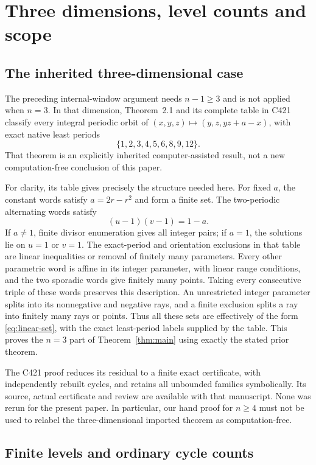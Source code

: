 \section{Three dimensions, level counts and scope}
\label{sec:completion}

\subsection{The inherited three-dimensional case}

The preceding internal-window argument needs $n-1\ge3$ and is not
applied when $n=3$. In that dimension, Theorem~2.1 and its complete
table in C421~\cite{c421} classify every integral periodic orbit of
$(x,y,z)\mapsto(y,z,yz+a-x)$, with exact native least periods
\[
 \{1,2,3,4,5,6,8,9,12\}.
\]
That theorem is an explicitly inherited computer-assisted result,
not a new computation-free conclusion of this paper.

For clarity, its table gives precisely the structure needed here.
For fixed $a$, the constant words satisfy $a=2r-r^2$ and form a
finite set. The two-periodic alternating words satisfy
\[
 (u-1)(v-1)=1-a.
\]
If $a\ne1$, finite divisor enumeration gives all integer pairs;
if $a=1$, the solutions lie on $u=1$ or $v=1$. The exact-period
and orientation exclusions in that table are linear inequalities
or removal of finitely many parameters. Every other parametric
word is affine in its integer parameter, with linear range
conditions, and the two sporadic words give finitely many points.
Taking every consecutive triple of these words preserves this
description. An unrestricted integer parameter splits into its
nonnegative and negative rays, and a finite exclusion splits a
ray into finitely many rays or points. Thus all these sets are
effectively of the form \eqref{eq:linear-set}, with the exact
least-period labels supplied by the table. This proves the
$n=3$ part of Theorem~\ref{thm:main} using exactly the stated
prior theorem.

The C421 proof reduces its residual to a finite exact certificate,
with independently rebuilt cycles, and retains all unbounded
families symbolically. Its source, actual certificate and review
are available with that manuscript. None was rerun for the present
paper. In particular, our hand proof for $n\ge4$ must not be used
to relabel the three-dimensional imported theorem as computation-free.

\subsection{Finite levels and ordinary cycle counts}

